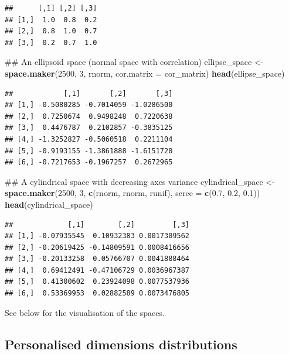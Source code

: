 \documentclass[]{book}
\newenvironment{Shaded}{\begin{snugshade}}{\end{snugshade}}
\newcommand{\KeywordTok}[1]{\textcolor[rgb]{0.13,0.29,0.53}{\textbf{#1}}}
\newcommand{\DataTypeTok}[1]{\textcolor[rgb]{0.13,0.29,0.53}{#1}}
\newcommand{\DecValTok}[1]{\textcolor[rgb]{0.00,0.00,0.81}{#1}}
\newcommand{\FloatTok}[1]{\textcolor[rgb]{0.00,0.00,0.81}{#1}}
\newcommand{\StringTok}[1]{\textcolor[rgb]{0.31,0.60,0.02}{#1}}
\newcommand{\NormalTok}[1]{#1}
\theoremstyle{definition}
\theoremstyle{definition}
\theoremstyle{remark}
\begin{document}
\begin{verbatim}
##      [,1] [,2] [,3]
## [1,]  1.0  0.8  0.2
## [2,]  0.8  1.0  0.7
## [3,]  0.2  0.7  1.0
\end{verbatim}

\begin{Shaded}
\begin{Highlighting}[]
\NormalTok{## An ellipsoid space (normal space with correlation)}
\NormalTok{ellipse_space <-}\StringTok{ }\KeywordTok{space.maker}\NormalTok{(}\DecValTok{2500}\NormalTok{, }\DecValTok{3}\NormalTok{, rnorm, }\DataTypeTok{cor.matrix =}\NormalTok{ cor_matrix)}
\KeywordTok{head}\NormalTok{(ellipse_space)}
\end{Highlighting}
\end{Shaded}

\begin{verbatim}
##            [,1]       [,2]       [,3]
## [1,] -0.5080285 -0.7014059 -1.0286500
## [2,]  0.7250674  0.9498248  0.7220638
## [3,]  0.4476787  0.2102857 -0.3835125
## [4,] -1.3252827 -0.5060518  0.2211104
## [5,] -0.9193155 -1.3861888 -1.6151720
## [6,] -0.7217653 -0.1967257  0.2672965
\end{verbatim}

\begin{Shaded}
\begin{Highlighting}[]
\NormalTok{## A cylindrical space with decreasing axes variance}
\NormalTok{cylindrical_space <-}\StringTok{ }\KeywordTok{space.maker}\NormalTok{(}\DecValTok{2500}\NormalTok{, }\DecValTok{3}\NormalTok{, }\KeywordTok{c}\NormalTok{(rnorm, rnorm, runif),}
                                 \DataTypeTok{scree =} \KeywordTok{c}\NormalTok{(}\FloatTok{0.7}\NormalTok{, }\FloatTok{0.2}\NormalTok{, }\FloatTok{0.1}\NormalTok{))}
\KeywordTok{head}\NormalTok{(cylindrical_space)}
\end{Highlighting}
\end{Shaded}

\begin{verbatim}
##             [,1]        [,2]         [,3]
## [1,] -0.07935545  0.10932383 0.0017309562
## [2,] -0.20619425 -0.14809591 0.0008416656
## [3,] -0.20133258  0.05766707 0.0041888464
## [4,]  0.69412491 -0.47106729 0.0036967387
## [5,]  0.41300602  0.23924098 0.0077537936
## [6,]  0.53369953  0.02882589 0.0073476805
\end{verbatim}

See below for the visualisation of the spaces.

\subsection{Personalised dimensions
distributions}\label{personalised-dimensions-distributions}
\end{document}
